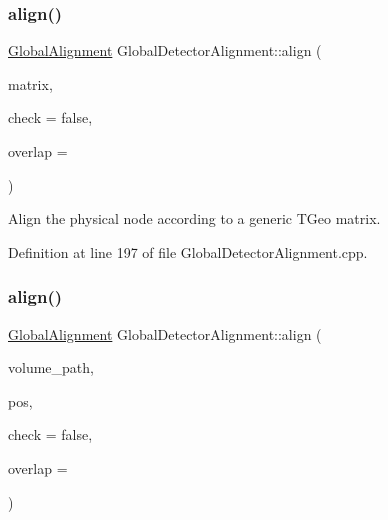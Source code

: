 \subsubsection{\texorpdfstring{align()}{align()}\hspace{0.1cm}{\footnotesize\ttfamily [5/10]}}
{\footnotesize\ttfamily \hyperlink{class_d_d4hep_1_1_alignments_1_1_global_alignment}{Global\+Alignment} Global\+Detector\+Alignment\+::align (\begin{DoxyParamCaption}\item[{T\+Geo\+H\+Matrix $\ast$}]{matrix,  }\item[{bool}]{check = {\ttfamily false},  }\item[{double}]{overlap = {} }\end{DoxyParamCaption})}



Align the physical node according to a generic T\+Geo matrix. 



Definition at line 197 of file Global\+Detector\+Alignment.\+cpp.

\hypertarget{class_d_d4hep_1_1_alignments_1_1_global_detector_alignment_ab789540ed6730b4440cc3a2fa716ad32}{}\label{class_d_d4hep_1_1_alignments_1_1_global_detector_alignment_ab789540ed6730b4440cc3a2fa716ad32} 
\subsubsection{\texorpdfstring{align()}{align()}\hspace{0.1cm}{\footnotesize\ttfamily [6/10]}}
{\footnotesize\ttfamily \hyperlink{class_d_d4hep_1_1_alignments_1_1_global_alignment}{Global\+Alignment} Global\+Detector\+Alignment\+::align (\begin{DoxyParamCaption}\item[{const std\+::string \&}]{volume\+\_\+path,  }\item[{const Position \&}]{pos,  }\item[{bool}]{check = {\ttfamily false},  }\item[{double}]{overlap = {} }\end{DoxyParamCaption})}



